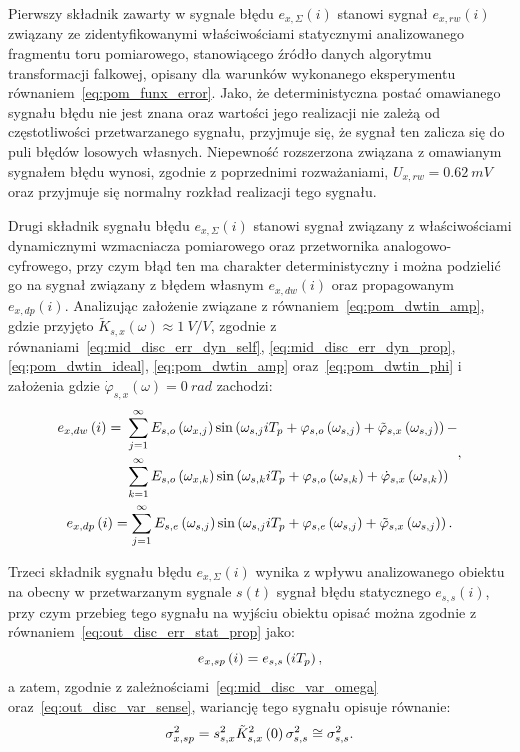 Pierwszy składnik zawarty w sygnale błędu $e_{x,\Sigma}(i)$ stanowi sygnał $e_{x,rw}(i)$ związany ze zidentyfikowanymi właściwościami statycznymi analizowanego fragmentu toru pomiarowego, stanowiącego źródło danych algorytmu transformacji falkowej, opisany dla warunków wykonanego eksperymentu równaniem~\eqref{eq:pom_funx_error}. Jako, że deterministyczna postać omawianego sygnału błędu nie jest znana oraz wartości jego realizacji nie zależą od częstotliwości przetwarzanego sygnału, przyjmuje się, że sygnał ten zalicza się do puli błędów losowych własnych. Niepewność rozszerzona związana z omawianym sygnałem błędu wynosi, zgodnie z poprzednimi rozważaniami, $U_{x,rw} = \qty{0.62}{mV}$ oraz przyjmuje się normalny rozkład realizacji tego sygnału.

Drugi składnik sygnału błędu $e_{x,\Sigma}(i)$ stanowi sygnał związany z właściwościami dynamicznymi wzmacniacza pomiarowego oraz przetwornika analogowo-cyfrowego, przy czym błąd ten ma charakter deterministyczny i można podzielić go na sygnał związany z błędem własnym $e_{x,dw}(i)$ oraz propagowanym $e_{x,dp}(i)$. Analizując założenie związane z równaniem~\eqref{eq:pom_dwtin_amp}, gdzie przyjęto $\tilde{K}_{s,x}(\omega) \approx \qty{1}{V \per V}$, zgodnie z równaniami~\eqref{eq:mid_disc_err_dyn_self}, \eqref{eq:mid_disc_err_dyn_prop}, \eqref{eq:pom_dwtin_ideal}, \eqref{eq:pom_dwtin_amp} oraz~\eqref{eq:pom_dwtin_phi} i założenia gdzie $\dot{\varphi}_{s,x}(\omega) = \qty{0}{rad}$ zachodzi:
\begin{gather}
\begin{split}
e_{x,dw} \left(i\right) =~
& \sum _{j = 1} ^{\infty} E_{s,o} \left(\omega_{x,j}\right) \sin \left( \omega_{s,j} iT_{p} + \varphi_{s,o} \left(\omega_{s,j}\right) + \tilde{\varphi}_{s,x} \left(\omega_{s,j}\right) \right) - \\
& \sum _{k = 1} ^{\infty} E_{s,o} \left(\omega_{x,k}\right) \sin \left( \omega_{s,k} iT_{p} + \varphi_{s,o} \left(\omega_{s,k}\right) + \dot{\varphi}_{s,x} \left(\omega_{s,k}\right) \right)
\end{split}
\label{eq:pom_errx_dyn_self}, \\
e_{x,dp} \left(i\right) = \sum _{j = 1} ^{\infty} E_{s,e} \left(\omega_{s,j}\right) \sin \left( \omega_{s,j} iT_{p} + \varphi_{s,e} \left(\omega_{s,j}\right) + \tilde{\varphi}_{s,x} \left(\omega_{s,j}\right) \right) \label{eq:pom_errx_dyn_prop}.
\end{gather}

Trzeci składnik sygnału błędu $e_{x,\Sigma}(i)$ wynika z wpływu analizowanego obiektu na obecny w przetwarzanym sygnale $s(t)$ sygnał błędu statycznego $e_{s,s}(i)$, przy czym przebieg tego sygnału na wyjściu obiektu opisać można zgodnie z równaniem~\eqref{eq:out_disc_err_stat_prop} jako:
\begin{equation}
e_{x,sp} \left(i\right) = e_{s,s} \left(i T_{p}\right) \label{eq:pom_errx_stat_prop},
\end{equation}
a zatem, zgodnie z zależnościami~\eqref{eq:mid_disc_var_omega} oraz~\eqref{eq:out_disc_var_sense}, wariancję tego sygnału opisuje równanie:
\begin{equation}
\sigma_{x,sp}^{2} = s_{s,x}^{2} \tilde{K}_{s,x}^{2} \left(0\right) \sigma_{s,s}^{2} \cong \sigma_{s,s}^{2} \label{eq:pom_varx_stat_prop}.
\end{equation}

